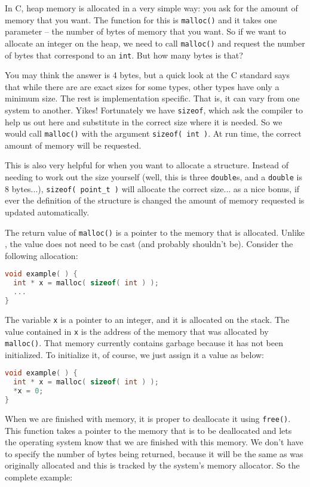 In C, heap memory is allocated in a very simple way: you ask for the amount of memory that you want. The function for this is \texttt{malloc()} and it takes one parameter -- the number of bytes of memory that you want. So if we want to allocate an integer on the heap, we need to call \texttt{malloc()} and request the number of bytes that correspond to an \texttt{int}. But how many bytes is that?

You may think the answer is 4 bytes, but a quick look at the C standard says that while there are are exact sizes for some types, other types have only a minimum size. The rest is implementation specific. That is, it can vary from one system to another. Yikes! Fortunately we have \texttt{sizeof}, which ask the compiler to help us out here and substitute in the correct size where it is needed. So we would call \texttt{malloc()} with the argument \texttt{sizeof( int )}. At run time, the correct amount of memory will be requested.

This is also very helpful for when you want to allocate a structure. Instead of needing to work out the size yourself (well, this is three \texttt{double}s, and a \texttt{double} is 8 bytes...), \texttt{sizeof( point\_t )} will allocate the correct size... as a nice bonus, if ever the definition of the structure is changed the amount of memory requested is updated automatically.

The return value of \texttt{malloc()} is a pointer to the memory that is allocated. Unlike \Cpp, the value does not need to be cast (and probably shouldn't be).
Consider the following allocation:

\begin{lstlisting}[language=C]
void example( ) {
  int * x = malloc( sizeof( int ) );
  ...
}
\end{lstlisting}

The variable \texttt{x} is a pointer to an integer, and it is allocated on the stack. The value contained in \texttt{x} is the address of the memory that was allocated by \texttt{malloc()}. That memory currently contains garbage because it has not been initialized. To initialize it, of course, we just assign it a value as below:

\begin{lstlisting}[language=C]
void example( ) {
  int * x = malloc( sizeof( int ) );
  *x = 0;
}
\end{lstlisting}

When we are finished with memory, it is proper to deallocate it using \texttt{free()}. This function takes a pointer to the memory that is to be deallocated and lets the operating system know that we are finished with this memory. We don't have to specify the number of bytes being returned, because it will be the same as was originally allocated and this is tracked by the system's memory allocator. So the complete example:

